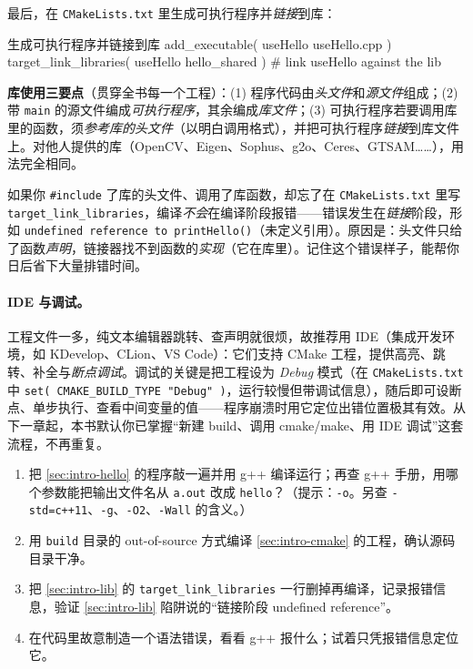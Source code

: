 \noindent 最后，在 \texttt{CMakeLists.txt} 里生成可执行程序并\emph{链接}到库：

\begin{codebox}[text]{生成可执行程序并链接到库}
add_executable( useHello useHello.cpp )
target_link_libraries( useHello hello_shared )   # link useHello against the lib
\end{codebox}

\begin{insight}
\textbf{库使用三要点}（贯穿全书每一个工程）：(1) 程序代码由\emph{头文件}和\emph{源文件}组成；(2) 带 \texttt{main} 的源文件编成\emph{可执行程序}，其余编成\emph{库文件}；(3) 可执行程序若要调用库里的函数，须\emph{参考库的头文件}（以明白调用格式），并把可执行程序\emph{链接}到库文件上\cite{gaoxiang2019slam14}。对他人提供的库（OpenCV、Eigen、Sophus、g2o、Ceres、GTSAM……），用法完全相同。
\end{insight}

\begin{pitfall}[陷阱：忘了链接库会怎样]
如果你 \texttt{\#include} 了库的头文件、调用了库函数，却忘了在 \texttt{CMakeLists.txt} 里写 \texttt{target\_link\_libraries}，编译\emph{不会}在编译阶段报错——错误发生在\emph{链接}阶段，形如 \texttt{undefined reference to printHello()}（未定义引用）。原因是：头文件只给了函数\emph{声明}，链接器找不到函数的\emph{实现}（它在库里）。记住这个错误样子，能帮你日后省下大量排错时间。
\end{pitfall}

\paragraph{IDE 与调试。}
工程文件一多，纯文本编辑器跳转、查声明就很烦，故推荐用 IDE（集成开发环境，如 KDevelop、CLion、VS Code）：它们支持 CMake 工程，提供高亮、跳转、补全与\emph{断点调试}。调试的关键是把工程设为 \emph{Debug} 模式（在 \texttt{CMakeLists.txt} 中 \texttt{set( CMAKE\_BUILD\_TYPE "Debug" )}，运行较慢但带调试信息），随后即可设断点、单步执行、查看中间变量的值——程序崩溃时用它定位出错位置极其有效。从下一章起，本书默认你已掌握“新建 build、调用 cmake/make、用 IDE 调试”这套流程，不再重复。

\begin{practice}
\begin{enumerate}
  \item 把 \cref{sec:intro-hello} 的程序敲一遍并用 g++ 编译运行；再查 g++ 手册，用哪个参数能把输出文件名从 \texttt{a.out} 改成 \texttt{hello}？（提示：\texttt{-o}。另查 \texttt{-std=c++11}、\texttt{-g}、\texttt{-O2}、\texttt{-Wall} 的含义。）
  \item 用 \texttt{build} 目录的 out-of-source 方式编译 \cref{sec:intro-cmake} 的工程，确认源码目录干净。
  \item 把 \cref{sec:intro-lib} 的 \texttt{target\_link\_libraries} 一行删掉再编译，记录报错信息，验证 \cref{sec:intro-lib} 陷阱说的“链接阶段 undefined reference”。
  \item 在代码里故意制造一个语法错误，看看 g++ 报什么；试着只凭报错信息定位它。
\end{enumerate}
\end{practice}

